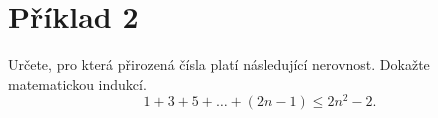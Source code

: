\section*{Příklad 2}
Určete, pro která přirozená čísla platí následující nerovnost. Dokažte matematickou indukcí.
$$ 1 + 3 + 5 + \hdots + (2n - 1) \leq 2n^2 - 2.$$

